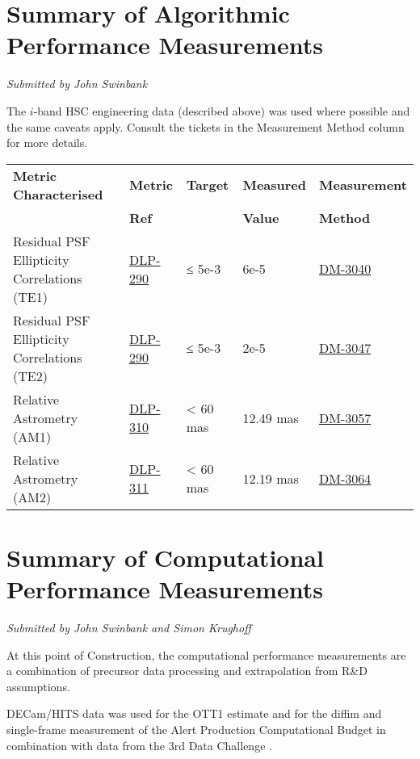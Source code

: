 \documentclass[DM,toc,lsstdraft]{lsstdoc}
\begin{document}
\section{Summary of Algorithmic Performance
Measurements}\label{summary-of-algorithmic-performance-measurements}

\emph{Submitted by John Swinbank}

The $i$-band HSC engineering data (described above) was used where
possible and the same caveats apply. Consult the tickets in the
Measurement Method column for more details.

\begin{small}
\begin{longtable}[]{@{}lllll@{}}
\toprule
\textbf{Metric Characterised} & \textbf{Metric} & \textbf{Target} &
\textbf{Measured} & \textbf{Measurement}\tabularnewline
 & \textbf{Ref} &  &
\textbf{Value} & \textbf{Method}\tabularnewline
\midrule
\endhead
Residual PSF Ellipticity Correlations (TE1) &
\href{https://jira.lsstcorp.org/browse/DLP-290}{DLP-290} & ≤ 5e-3 & 6e-5
&
\href{https://jira.lsstcorp.org/browse/DM-3040}{DM-3040}\tabularnewline
Residual PSF Ellipticity Correlations (TE2) &
\href{https://jira.lsstcorp.org/browse/DLP-290}{DLP-290} & ≤ 5e-3 & 2e-5
& \href{https://jira.lsstcorp.org/browse/DM-3047}{DM-3047
}\tabularnewline
Relative Astrometry (AM1) &
\href{https://jira.lsstcorp.org/browse/DLP-310}{DLP-310} & \textless{}
60 mas & 12.49 mas &
\href{https://jira.lsstcorp.org/browse/DM-3057}{DM-3057}\tabularnewline
Relative Astrometry (AM2) &
\href{https://jira.lsstcorp.org/browse/DLP-311}{DLP-311} & \textless{}
60 mas & 12.19 mas &
\href{https://jira.lsstcorp.org/browse/DM-3064}{DM-3064}\tabularnewline
\bottomrule
\end{longtable}
\end{small}

\section{Summary of Computational Performance
Measurements}\label{summary-of-computational-performance-measurements}

\emph{Submitted by John Swinbank and
Simon Krughoff}

At this point of Construction, the computational performance
measurements are a combination of precursor data processing and
extrapolation from R\&D assumptions.

DECam/HITS data was used for the OTT1 estimate and for the diffim and
single-frame measurement of the Alert Production Computational Budget in
combination with data from the
3rd Data Challenge .
\end{document}
